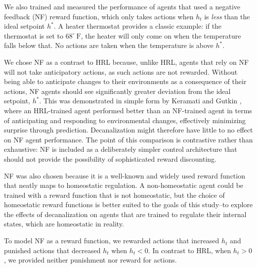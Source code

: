 \documentclass[12pt,fleqn]{article}
\begin{document}
We also trained and measured the performance of agents that used a negative feedback (NF) reward function, which only takes actions when \(h_t\) is \emph{less} than the ideal setpoint \(h^*\). A heater thermostat provides a classic example: if the thermostat is set to $68^\circ\ \mathrm{F}$, the heater will only come on when the temperature falls below that. No actions are taken when the temperature is above \(h^*\).

We chose NF as a contrast to HRL because, unlike HRL, agents that rely on NF will not take anticipatory actions, as such actions are not rewarded. Without being able to anticipate changes to their environments as a consequence of their actions, NF agents should see significantly greater deviation from the ideal setpoint, \(h^*\). This was demonstrated in simple form by Keramati and Gutkin \cite{keramati_homeostatic_2014}, where an HRL-trained agent performed better than an NF-trained agent in terms of anticipating and responding to environmental changes, effectively minimizing surprise through prediction. Decanalization might therefore have little to no effect on NF agent performance. The point of this comparison is contrastive rather than exhaustive: NF is included as a deliberately simpler control architecture that should not provide the possibility of sophisticated reward discounting. 

NF was also chosen because it is a well-known and widely used reward function that neatly maps to homeostatic regulation. A non-homeostatic agent could be trained with a reward function that is not homeostatic, but the choice of homeostatic reward functions is better suited to the goals of this study--to explore the effects of decanalization on agents that are trained to regulate their internal states, which are homeostatic in reality.

To model NF as a reward function, we rewarded actions that increased \(h_t\) and punished actions that decreased \(h_t\) when \(h_t < 0\). In contrast to HRL, when \(h_t > 0\), we provided neither punishment nor reward for actions.
\end{document}
